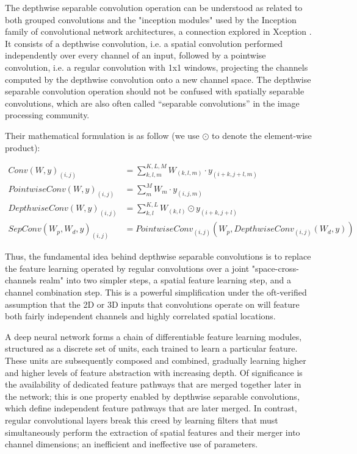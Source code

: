 \documentclass{article}
\begin{document}
The depthwise separable convolution operation can be understood as related to both grouped convolutions and the "inception modules" used by the Inception family of convolutional network architectures, a connection explored in Xception \citep{xception2016}. It consists of a depthwise convolution, i.e. a spatial convolution performed independently over every channel of an input, followed by a pointwise convolution, i.e. a regular convolution with 1x1 windows, projecting the channels computed by the depthwise convolution onto a new channel space. The depthwise separable convolution operation should not be confused with spatially separable convolutions, which are also often called “separable convolutions” in the image processing community.

Their mathematical formulation is as follow (we use \(\odot\) to denote the element-wise product):

\begin{align*}
    Conv(W, y)_{(i,j)} &= \sum^{K,L,M}_{k,l,m} W_{(k,l,m)} \cdot y_{(i+k, j+l, m)} \\
    PointwiseConv(W, y)_{(i,j)} &= \sum^{M}_{m} W_{m} \cdot y_{(i, j, m)} \\
    DepthwiseConv(W, y)_{(i,j)} &= \sum^{K,L}_{k,l} W_{(k,l)} \odot y_{(i+k, j+l)} \\
    SepConv(W_p, W_d, y)_{(i,j)} &= PointwiseConv_{(i,j)}(W_p, DepthwiseConv_{(i,j)}(W_d, y))
\end{align*}

Thus, the fundamental idea behind depthwise separable convolutions is to replace the feature learning operated by regular convolutions over a joint "space-cross-channels realm" into two simpler steps, a spatial feature learning step, and a channel combination step. This is a powerful simplification under the oft-verified assumption that the 2D or 3D inputs that convolutions operate on will feature both fairly independent channels and highly correlated spatial locations.

A deep neural network forms a chain of differentiable feature learning modules, structured as a discrete set of units, each trained to learn a particular feature. These units are subsequently composed and combined, gradually learning higher and higher levels of feature abstraction with increasing depth. Of significance is the availability of dedicated feature pathways that are merged together later in the network; this is one property enabled by depthwise separable convolutions, which define independent feature pathways that are later merged. In contrast, regular convolutional layers break this creed by learning filters that must simultaneously perform the extraction of spatial features and their merger into channel dimensions; an inefficient and ineffective use of parameters.
\end{document}
